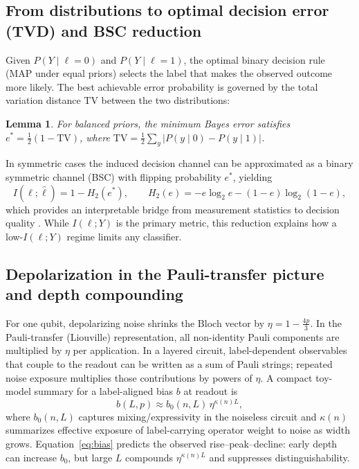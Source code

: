 \documentclass[]{ieeeaccess}
\newtheorem{lemma}{Lemma}
\newcommand{\MI}{I(\ell;Y)}
\newcommand{\Htwo}{H_2}
\newcommand{\TV}{\mathrm{TV}}
\begin{document}
\subsection{From distributions to optimal decision error (TVD) and BSC reduction}
Given $P(Y\mid \ell=0)$ and $P(Y\mid \ell=1)$, the optimal binary decision rule (MAP under equal priors) selects the label that makes the observed outcome more likely. The best achievable error probability is governed by the total variation distance $\TV$ between the two distributions:
\begin{lemma}
For balanced priors, the minimum Bayes error satisfies $e^{\ast}=\tfrac{1}{2}(1-\TV)$, where $\TV=\tfrac{1}{2}\sum_y |P(y\mid 0)-P(y\mid 1)|$.
\end{lemma}
In symmetric cases the induced decision channel can be approximated as a binary symmetric channel (BSC) with flipping probability $e^{\ast}$, yielding
\begin{equation}
I(\ell;\hat{\ell}) = 1-\Htwo(e^{\ast}),\qquad 
\Htwo(e)=-e\log_2 e -(1-e)\log_2(1-e),
\end{equation}
which provides an interpretable bridge from measurement statistics to decision quality \cite{ref3}. While $\MI$ is the primary metric, this reduction explains how a low-$\MI$ regime limits any classifier.

\subsection{Depolarization in the Pauli-transfer picture and depth compounding}
For one qubit, depolarizing noise shrinks the Bloch vector by $\eta=1-\tfrac{4p}{3}$. In the Pauli-transfer (Liouville) representation, all non-identity Pauli components are multiplied by $\eta$ per application. In a layered circuit, label-dependent observables that couple to the readout can be written as a sum of Pauli strings; repeated noise exposure multiplies those contributions by powers of $\eta$. A compact toy-model summary for a label-aligned bias $b$ at readout is
\begin{equation}
b(L,p)\approx b_0(n,L)\,\eta^{\kappa(n)L},
\label{eq:bias}
\end{equation}
where $b_0(n,L)$ captures mixing/expressivity in the noiseless circuit and $\kappa(n)$ summarizes effective exposure of label-carrying operator weight to noise as width grows. Equation~\eqref{eq:bias} predicts the observed rise--peak--decline: early depth can increase $b_0$, but large $L$ compounds $\eta^{\kappa(n)L}$ and suppresses distinguishability.
\end{document}

